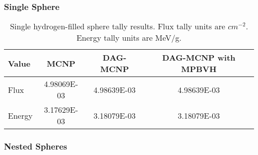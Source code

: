   \subsubsection{Single Sphere}

  \begin{table}[H]
    \small
    \begin{center}
      \begin{tabular}{lccc}
        \toprule
        Value & MCNP & DAG-MCNP & DAG-MCNP with MPBVH \\
        \toprule
        \hline
        Flux   & 4.98069E-03 & 4.98639E-03 & 4.98639E-03 \\
        Energy & 3.17629E-03 & 3.18079E-03 & 3.18079E-03 \\
        \bottomrule
      \end{tabular}
      \caption[Single hydrogen-filled sphere tally results.]{Single
        hydrogen-filled sphere tally results. Flux tally units are
        $cm^{-2}$. Energy tally units are MeV/g.}
      \label{nestedspheres}
    \end{center}
  \end{table}

  \subsubsection{Nested Spheres}


